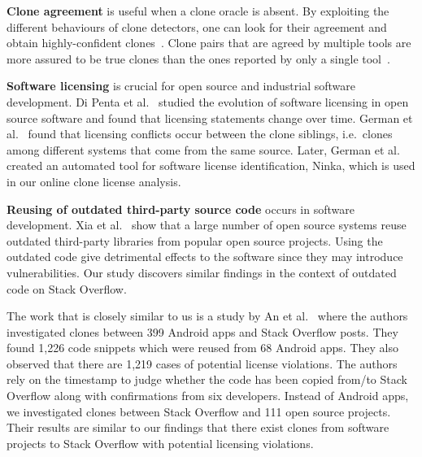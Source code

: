 \documentclass[sigconf,review, anonymous]{acmart}
\begin{document}
\textbf{Clone agreement} is useful when a clone oracle is
absent. %
By exploiting the different behaviours of clone detectors,
one can look for their agreement and obtain
highly-confident clones~\cite{Bellon2007,Wang2013}. %
Clone pairs that are agreed by multiple tools are more assured to be true
clones than the ones reported by only a single
tool~\cite{Wang2013,cr2016ssbse,Funaro2010}. 

\textbf{Software licensing} is crucial for open source and 
industrial software development. Di Penta et al.~\cite{DiPenta2010}
studied the evolution of software licensing in open source 
software and found that licensing statements change over 
time. German et al.~\cite{German2009} found that licensing 
conflicts occur between the clone siblings, i.e.~clones among 
different systems that come from the same source. Later, 
German et al.~\cite{German2010} created an automated tool 
for software license identification, Ninka, which is used
in our online clone license analysis. 

\textbf{Reusing of outdated third-party source code} occurs 
in software development. Xia et al.~\cite{Xia2014} show that 
a large number of open source systems reuse outdated third-party 
libraries from popular open source projects. Using the outdated 
code give detrimental effects to the software since they may 
introduce vulnerabilities. Our study discovers similar findings 
in the context of outdated code on Stack Overflow.

The work that is closely similar to us is a study by 
An et al.~\cite{An2017} where the authors investigated 
clones between 399 Android apps and Stack Overflow posts. 
They found 1,226 code snippets which were reused from 68 Android apps. 
They also observed that there are 1,219 cases of potential 
license violations. The authors rely on the timestamp to 
judge whether the code has been copied from/to Stack Overflow 
along with confirmations from six developers. Instead of Android apps, 
we investigated clones between Stack Overflow and 111 open 
source projects. Their results are similar to our findings that 
there exist clones from software projects to Stack Overflow with 
potential licensing violations. 
\end{document}
